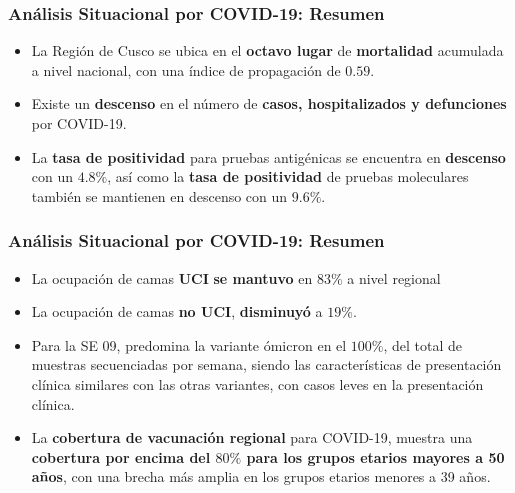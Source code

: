 \documentclass[xcolor=table]{beamer}
\begin{document}
\begin{frame}[label=resumen]
	\frametitle{Análisis Situacional por COVID-19: Resumen}
	\vspace{-.5cm}
	\begin{itemize}
		\item La Región de Cusco se ubica en el \textbf{\color{mycolor4}octavo lugar} de \textbf{\color{mycolor3}mortalidad} acumulada a nivel nacional, con una índice de propagación de $0.59 $.   
		\item Existe un \textbf{\color{mycolor4}descenso} en el número de \textbf{\color{mycolor3}casos, hospitalizados y defunciones} por COVID-19.
		\item La \textbf{\color{mycolor3}tasa de positividad} para pruebas antigénicas se encuentra en  \textbf{\color{mycolor4}descenso} con un $4.8\%$, así como la \textbf{\color{mycolor3}tasa de positividad} de pruebas moleculares también se mantienen en descenso con un $9.6\%$.
		\end{itemize}
\end{frame}

\begin{frame}
	\frametitle{Análisis Situacional por COVID-19: Resumen}
	\vspace{-.5cm}
	\begin{itemize}
	\item La ocupación de camas \textbf{\color{mycolor3}UCI} \textbf{\color{mycolor4}se mantuvo} en $83\% $ a nivel regional
	\item La ocupación de camas \textbf{\color{mycolor3}no UCI}, \textbf{\color{mycolor4}disminuyó} a $19\%$.
	\item Para la SE 09, predomina la variante ómicron en el $100\%$, del total de muestras secuenciadas por semana, siendo las características de presentación clínica similares con las otras variantes, con casos leves en la presentación clínica.
	\item La \textbf{\color{mycolor3}cobertura de vacunación regional} para COVID-19, muestra una \textbf{\color{mycolor4}cobertura por encima del $80\%$ para los grupos etarios mayores a 50 años}, con una brecha más amplia en los grupos etarios menores a 39 años.
	
	\end{itemize}
\end{frame}
\end{document}
